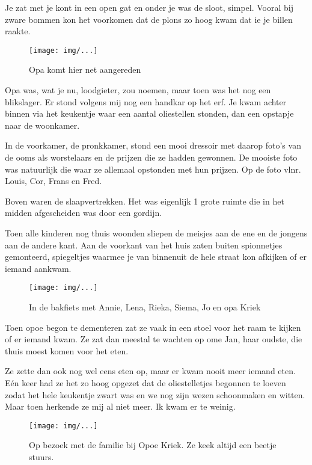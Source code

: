 \documentclass[10pt,twoside,openright]{memoir}
\begin{document}
Je zat met je kont in een open gat en onder je was de sloot, simpel. Vooral bij zware bommen kon het voorkomen dat de plons zo hoog kwam dat ie je billen raakte. 

\begin{figure}[t]
\texttt{[image: img/...]}
\caption{Opa komt hier net aangereden}
\end{figure}

Opa was, wat je nu, loodgieter, zou noemen, maar toen was het nog een blikslager. Er stond volgens mij nog een handkar op het erf. Je kwam achter binnen via het keukentje waar een aantal oliestellen stonden, dan een opstapje naar de woonkamer. 

In de voorkamer, de pronkkamer, stond een mooi dressoir met daarop foto’s van de ooms als worstelaars en de prijzen die ze hadden gewonnen. De mooiste foto was natuurlijk die waar ze allemaal opstonden met hun prijzen. Op de foto vlnr. Louis, Cor, Frans en Fred.

Boven waren de slaapvertrekken. Het was eigenlijk 1 grote ruimte die in het midden afgescheiden was door een gordijn. 

Toen alle kinderen nog thuis woonden sliepen de meisjes aan de ene en de jongens aan de andere kant. Aan de voorkant van het huis zaten buiten spionnetjes gemonteerd, spiegeltjes waarmee je van binnenuit de hele straat kon afkijken of er iemand aankwam. 

\begin{figure}[t]
\texttt{[image: img/...]}
\caption{In de bakfiets met Annie, Lena, Rieka, Siema, Jo en opa Kriek}
\end{figure}

Toen opoe begon te dementeren zat ze vaak in een stoel voor het raam te kijken of er iemand kwam. Ze zat dan meestal te wachten op ome Jan, haar oudste, die thuis moest komen voor het eten. 

Ze zette dan ook nog wel eens eten op, maar er kwam nooit meer iemand eten. Eén keer had ze het zo hoog opgezet dat de oliestelletjes begonnen te loeven zodat het hele keukentje zwart was en we nog zijn wezen schoonmaken en witten. Maar toen herkende ze mij al niet meer. Ik kwam er te weinig.

\begin{figure}[t]
\texttt{[image: img/...]}
\caption{Op bezoek met de familie bij Opoe Kriek. Ze keek altijd een beetje stuurs.}
\end{figure}
\end{document}
